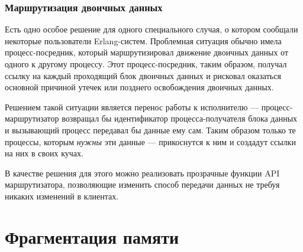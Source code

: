 \subsubsection{Маршрутизация двоичных данных}

Есть одно особое решение для одного специального случая, о котором сообщали некоторые пользователи Erlang-систем. Проблемная ситуация обычно имела процесс-посредник, который маршрутизировал движение двоичных данных от одного к другому процессу. Этот процесс-посредник, таким образом, получал ссылку на каждый проходящий блок двоичных данных и рисковал оказаться основной причиной утечек или позднего освобождения двоичных данных.

Решением такой ситуации является перенос работы к исполнителю --- процесс-маршрутизатор возвращал бы идентификатор процесса-получателя блока данных и вызывающий процесс передавал бы данные ему сам. Таким образом только те процессы, которым \emph{нужны} эти данные --- прикоснутся к ним и создадут ссылки на них в своих кучах.

В качестве решения для этого можно реализовать прозрачные функции API маршрутизатора, позволяющие изменить способ передачи данных не требуя никаких изменений в клиентах.


\section{Фрагментация памяти}
\label{sec:memory-fragmentation}

